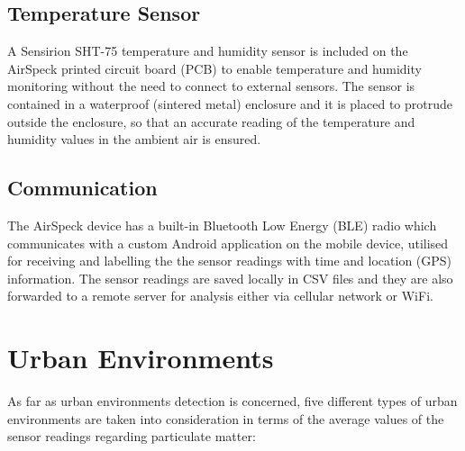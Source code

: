 \documentclass[bsc,frontabs,twoside,singlespacing,parskip,deptreport]{infthesis}     %
\begin{document}
\subsection*{Temperature Sensor}

A Sensirion SHT-75 temperature and humidity sensor \cite{sensirion} is included on the AirSpeck printed circuit board (PCB) to enable temperature and humidity monitoring without the need to connect to external sensors. The sensor is contained in a waterproof (sintered metal) enclosure \cite{airspeck} and it is placed to protrude outside the enclosure, so that an accurate reading of the temperature and humidity values in the ambient air is ensured.


\subsection*{Communication}

The AirSpeck device has a built-in Bluetooth Low Energy (BLE) radio which communicates with a custom Android application on the mobile device, utilised for receiving and labelling the the sensor readings with time and location (GPS) information. The sensor readings are saved locally in CSV files and they are also forwarded to a remote server for analysis either via cellular network or WiFi.

\section{Urban Environments}

As far as urban environments detection is concerned, five different types of urban environments are taken into consideration in terms of the average values of the sensor readings regarding particulate matter:
\end{document}
